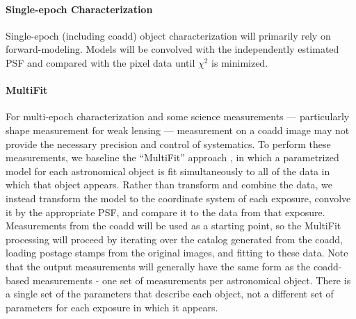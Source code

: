 \documentclass[12pt]{article}
\newcommand{\wbsPSF}{WBS 02C.04.03}
\begin{document}
\paragraph{Single-epoch Characterization}

Single-epoch (including coadd) object characterization will primarily rely on forward-modeling. Models will be convolved with the independently estimated PSF and compared with the pixel data until $\chi^2$ is minimized. %


\paragraph{MultiFit}
\label{sec:multifit}

For multi-epoch characterization and some science measurements --- particularly shape measurement for weak
lensing --- measurement on a coadd image may not provide the necessary
precision and control of systematics.  To perform these measurements,
we baseline the ``MultiFit'' approach \cite{Bosch10, Bosch13}, in which a
parametrized model for each astronomical object is fit simultaneously
to all of the data in which that object appears.  Rather than
transform and combine the data, we instead transform the model to the
coordinate system of each exposure, convolve it by the appropriate
PSF, and compare it to the data from that exposure.  Measurements from
the coadd will be used as a starting point, so the MultiFit processing
will proceed by iterating over the catalog generated from the coadd,
loading postage stamps from the original images, and fitting to these
data.  Note that the output measurements will generally have the same
form as the coadd-based measurements - one set of measurements per
astronomical object. There is a single set of the
parameters that describe each object, not a different set of parameters
for each exposure in which it appears.
\end{document}
